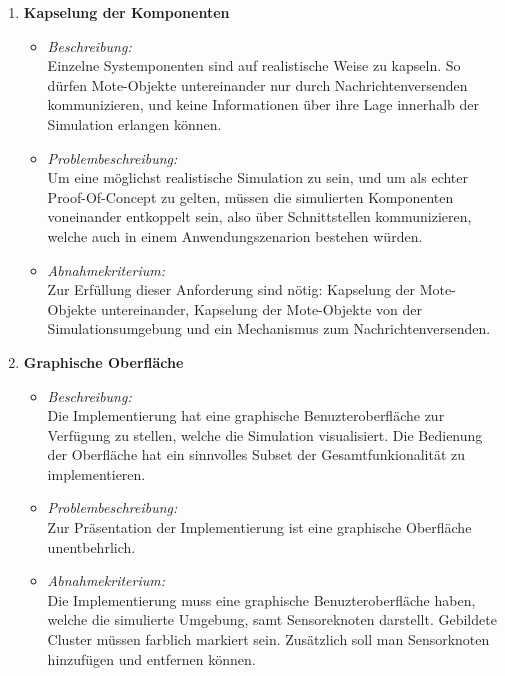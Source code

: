 \begin{enumerate}
\item \textbf{Kapselung der Komponenten}
  \begin{itemize}
  \item \emph{Beschreibung:}\\
  Einzelne Systemponenten sind auf realistische Weise zu kapseln.
  So dürfen Mote-Objekte untereinander nur durch Nachrichtenversenden kommunizieren, und keine Informationen über ihre Lage innerhalb  der Simulation erlangen können. 
  \item \emph{Problembeschreibung:}\\
Um eine m\"oglichst realistische Simulation zu sein, und um als echter Proof-Of-Concept zu gelten, m\"ussen die simulierten Komponenten voneinander entkoppelt sein, also \"uber Schnittstellen kommunizieren, welche auch in einem Anwendungszenarion bestehen w\"urden.
  \item \emph{Abnahmekriterium:}\\
    Zur Erf\"ullung dieser Anforderung sind n\"otig: Kapselung der Mote-Objekte untereinander, Kapselung der Mote-Objekte von der Simulationsumgebung und ein Mechanismus zum Nachrichtenversenden.
  \end{itemize}
\item \textbf{Graphische Oberfl\"ache}
  \begin{itemize}
  \item \emph{Beschreibung:}\\
    Die Implementierung hat eine graphische Benuzteroberfl\"ache zur Verf\"ugung zu stellen, welche die Simulation visualisiert. Die Bedienung der Oberfl\"ache hat ein sinnvolles Subset der Gesamtfunkionalit\"at zu implementieren.
  \item \emph{Problembeschreibung:}\\
  Zur Präsentation der Implementierung ist eine graphische Oberfläche unentbehrlich.
  \item \emph{Abnahmekriterium:}\\
    Die Implementierung muss eine graphische Benuzteroberfl\"ache haben, welche die simulierte Umgebung, samt Sensoreknoten darstellt. Gebildete Cluster m\"ussen farblich markiert sein. Zus\"atzlich soll man Sensorknoten hinzuf\"ugen und entfernen k\"onnen.
  \end{itemize}
\end{enumerate}
